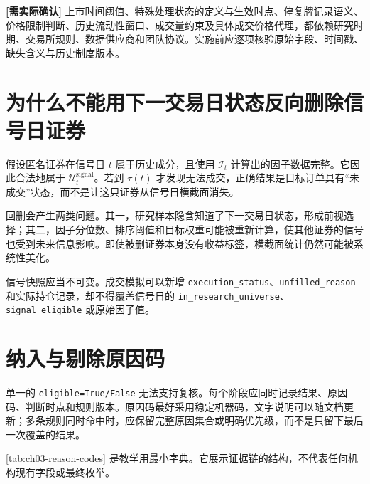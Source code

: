 \begin{confirmbox}
\textbf{[需实际确认]} 上市时间阈值、特殊处理状态的定义与生效时点、停复牌记录语义、价格限制判断、历史流动性窗口、成交量约束及具体成交价格代理，都依赖研究时期、交易所规则、数据供应商和团队协议。实施前应逐项核验原始字段、时间戳、缺失含义与历史制度版本。
\end{confirmbox}

\section{为什么不能用下一交易日状态反向删除信号日证券}

假设匿名证券在信号日 \(t\) 属于历史成分，且使用 \(\mathcal{I}_t\) 计算出的因子数据完整。它因此合法地属于 \(\mathcal{U}^{\mathrm{signal}}_t\)。若到 \(\tau(t)\) 才发现无法成交，正确结果是目标订单具有“未成交”状态，而不是让这只证券从信号日横截面消失。

回删会产生两类问题。其一，研究样本隐含知道了下一交易日状态，形成前视选择；其二，因子分位数、排序阈值和目标权重可能被重新计算，使其他证券的信号也受到未来信息影响。即使被删证券本身没有收益标签，横截面统计仍然可能被系统性美化。

\begin{principlebox}
信号快照应当不可变。成交模拟可以新增 \texttt{execution\_status}、\texttt{unfilled\_reason} 和实际持仓记录，却不得覆盖信号日的 \texttt{in\_research\_universe}、\texttt{signal\_eligible} 或原始因子值。
\end{principlebox}

\section{纳入与剔除原因码}

单一的 \texttt{eligible=True/False} 无法支持复核。每个阶段应同时记录结果、原因码、判断时点和规则版本。原因码最好采用稳定机器码，文字说明可以随文档更新；多条规则同时命中时，应保留完整原因集合或明确优先级，而不是只留下最后一次覆盖的结果。

\cref{tab:ch03-reason-codes} 是教学用最小字典。它展示证据链的结构，不代表任何机构现有字段或最终枚举。

